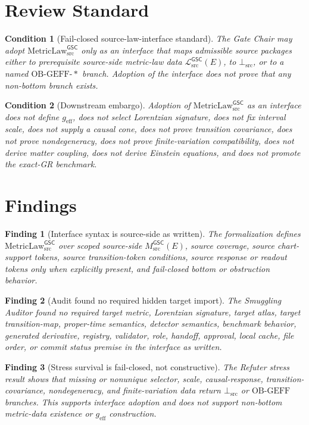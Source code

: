 \documentclass[11pt]{article}
\newcommand{\MsrcGSC}{M_{\mathrm{src}}^{\mathsf{GSC}}}
\newcommand{\MetricLaw}{\mathrm{MetricLaw}_{\mathrm{src}}^{\mathsf{GSC}}}
\newcommand{\MetricData}{\mathcal{L}_{\mathrm{src}}^{\mathsf{GSC}}}
\newcommand{\BottomSrc}{\bot_{\mathrm{src}}}
\newcommand{\geff}{g_{\mathrm{eff}}}
\newtheorem{finding}{Finding}
\newtheorem{condition}{Condition}
\begin{document}
\section{Review Standard}

\begin{condition}[Fail-closed source-law-interface standard]
The Gate Chair may adopt \(\MetricLaw\) only as an interface that maps
admissible source packages either to prerequisite source-side metric-law data
\(\MetricData(E)\), to \(\BottomSrc\), or to a named
\(\mathrm{OB\mbox{-}GEFF\mbox{-}*}\) branch. Adoption of the interface does
not prove that any non-bottom branch exists.
\end{condition}

\begin{condition}[Downstream embargo]
Adoption of \(\MetricLaw\) as an interface does not define \(\geff\), does
not select Lorentzian signature, does not fix interval scale, does not supply
a causal cone, does not prove transition covariance, does not prove
nondegeneracy, does not prove finite-variation compatibility, does not derive
matter coupling, does not derive Einstein equations, and does not promote the
exact-GR benchmark.
\end{condition}

\section{Findings}

\begin{finding}[Interface syntax is source-side as written]
The formalization defines \(\MetricLaw\) over scoped source-side
\(\MsrcGSC(E)\), source coverage, source chart-support tokens, source
transition-token conditions, source response or readout tokens only when
explicitly present, and fail-closed bottom or obstruction behavior.
\end{finding}

\begin{finding}[Audit found no required hidden target import]
The Smuggling Auditor found no required target metric, Lorentzian signature,
target atlas, target transition-map, proper-time semantics, detector
semantics, benchmark behavior, generated derivative, registry, validator,
role, handoff, approval, local cache, file order, or commit status premise in
the interface as written.
\end{finding}

\begin{finding}[Stress survival is fail-closed, not constructive]
The Refuter stress result shows that missing or nonunique selector, scale,
causal-response, transition-covariance, nondegeneracy, and finite-variation
data return \(\BottomSrc\) or \(\mathrm{OB\mbox{-}GEFF}\) branches. This
supports interface adoption and does not support non-bottom metric-data
existence or \(\geff\) construction.
\end{finding}
\end{document}
